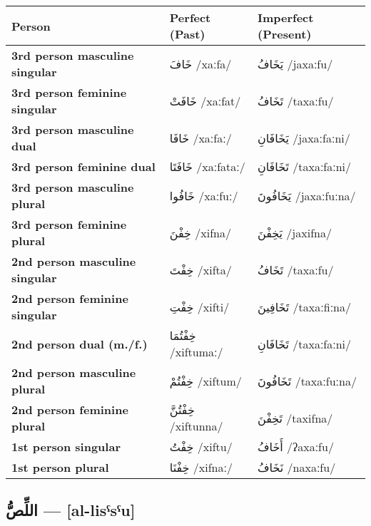 \documentclass[letterpaper,12pt]{article}
\begin{document}
\begin{longtable}{|>{\raggedright}p{3.5cm}|p{5cm}|p{5cm}|}
\hline
\textbf{Person} & \textbf{Perfect (Past)} & \textbf{Imperfect (Present)} \\
\hline
\textbf{3rd person masculine singular} & \textarabic{خَافَ} /xaːfa/ & \textarabic{يَخَافُ} /jaxaːfu/ \\
\hline
\textbf{3rd person feminine singular} & \textarabic{خَافَتْ} /xaːfat/ & \textarabic{تَخَافُ} /taxaːfu/ \\
\hline
\textbf{3rd person masculine dual} & \textarabic{خَافَا} /xaːfaː/ & \textarabic{يَخَافَانِ} /jaxaːfaːni/ \\
\hline
\textbf{3rd person feminine dual} & \textarabic{خَافَتَا} /xaːfataː/ & \textarabic{تَخَافَانِ} /taxaːfaːni/ \\
\hline
\textbf{3rd person masculine plural} & \textarabic{خَافُوا} /xaːfuː/ & \textarabic{يَخَافُونَ} /jaxaːfuːna/ \\
\hline
\textbf{3rd person feminine plural} & \textarabic{خِفْنَ} /xifna/ & \textarabic{يَخِفْنَ} /jaxifna/ \\
\hline
\textbf{2nd person masculine singular} & \textarabic{خِفْتَ} /xifta/ & \textarabic{تَخَافُ} /taxaːfu/ \\
\hline
\textbf{2nd person feminine singular} & \textarabic{خِفْتِ} /xifti/ & \textarabic{تَخَافِينَ} /taxaːfiːna/ \\
\hline
\textbf{2nd person dual (m./f.)} & \textarabic{خِفْتُمَا} /xiftumaː/ & \textarabic{تَخَافَانِ} /taxaːfaːni/ \\
\hline
\textbf{2nd person masculine plural} & \textarabic{خِفْتُمْ} /xiftum/ & \textarabic{تَخَافُونَ} /taxaːfuːna/ \\
\hline
\textbf{2nd person feminine plural} & \textarabic{خِفْتُنَّ} /xiftunna/ & \textarabic{تَخِفْنَ} /taxifna/ \\
\hline
\textbf{1st person singular} & \textarabic{خِفْتُ} /xiftu/ & \textarabic{أَخَافُ} /ʔaxaːfu/ \\
\hline
\textbf{1st person plural} & \textarabic{خِفْنَا} /xifnaː/ & \textarabic{نَخَافُ} /naxaːfu/ \\
\hline
\end{longtable}

\subsection{\textarabic{اللِّصُّ} — [al-lisˤsˤu]}
\end{document}
